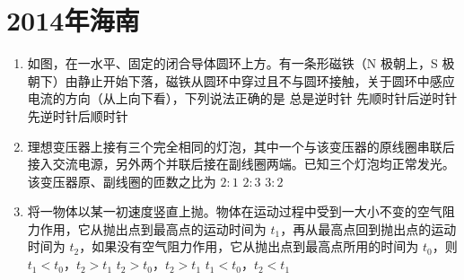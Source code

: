 \documentclass[\gkver]{gaokaozhenti}
\begin{document}
\chapter{2014年海南}

\begin{enumerate}
\item
如图，在一水平、固定的闭合导体圆环上方。有一条形磁铁（N 极朝上，S 极朝下）由静止开始下落，磁铁从圆环中穿过且不与圆环接触，关于圆环中感应电流的方向（从上向下看），下列说法正确的是
{总是逆时针}
{先顺时针后逆时针}
{先逆时针后顺时针}

\item
理想变压器上接有三个完全相同的灯泡，其中一个与该变压器的原线圈串联后接入交流电源，另外两个并联后接在副线圈两端。已知三个灯泡均正常发光。该变压器原、副线圈的匝数之比为
{$2:1$}
{$2:3$}
{$3:2$}

\item
将一物体以某一初速度竖直上抛。物体在运动过程中受到一大小不变的空气阻力作用，它从抛出点到最高点的运动时间为 $t_{1}$，再从最高点回到抛出点的运动时间为 $t_{2}$，如果没有空气阻力作用，它从抛出点到最高点所用的时间为 $t_{0}$，则
{$t_{1}<t_{0}$，$t_{2}>t_{1}$}
{$t_{2}>t_{0}$，$t_{2}>t_{1}$}
{$t_{1}<t_{0}$，$t_{2}<t_{1}$}


\end{enumerate}
\end{document}
